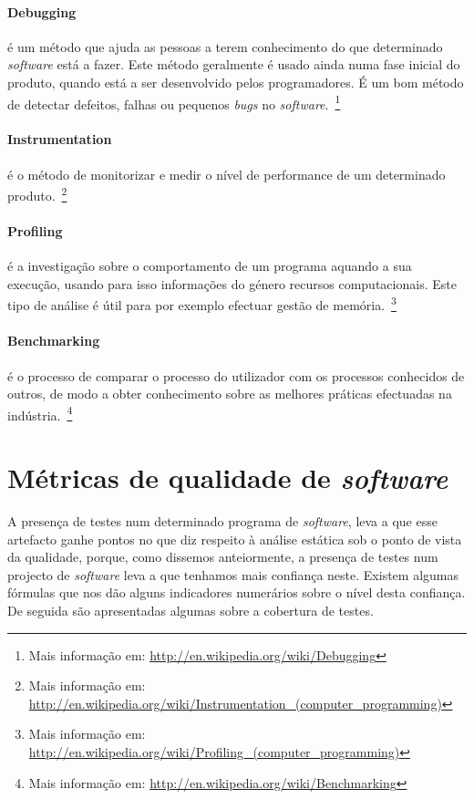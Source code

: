 \paragraph{Debugging} é um método que ajuda as pessoas a terem conhecimento do que determinado \emph{software} está a fazer. Este método geralmente é usado ainda numa 
fase inicial do produto, quando está a ser desenvolvido pelos programadores. É um bom método de detectar defeitos, falhas ou pequenos \emph{bugs} no \emph{software}.~\footnote{Mais informação em: \url{http://en.wikipedia.org/wiki/Debugging}}

\paragraph{Instrumentation} é o método de monitorizar e medir o nível de performance de um determinado produto.~\footnote{Mais informação em: \url{http://en.wikipedia.org/wiki/Instrumentation_(computer_programming)}}

\paragraph{Profiling} é a investigação sobre o comportamento de um programa aquando a sua execução, usando para isso informações do género recursos computacionais. 
Este tipo de análise é útil para por exemplo efectuar gestão de memória.~\footnote{Mais informação em: \url{http://en.wikipedia.org/wiki/Profiling_(computer_programming)}}

\paragraph{Benchmarking} é o processo de comparar o processo do utilizador com os processos conhecidos de outros, de modo a obter conhecimento 
sobre as melhores práticas efectuadas na indústria.~\footnote{Mais informação em: \url{http://en.wikipedia.org/wiki/Benchmarking}}

\section{Métricas de qualidade de \emph{software}}

A presença de testes num determinado programa de \emph{software}, leva a que esse artefacto ganhe pontos no que diz respeito à análise estática sob o ponto de vista da 
qualidade, porque, como dissemos anteiormente, a presença de testes num projecto de \emph{software} leva a que tenhamos mais confiança neste.
Existem algumas fórmulas que nos dão alguns indicadores numerários sobre o nível desta confiança. De seguida são apresentadas algumas sobre a cobertura de testes.\\

